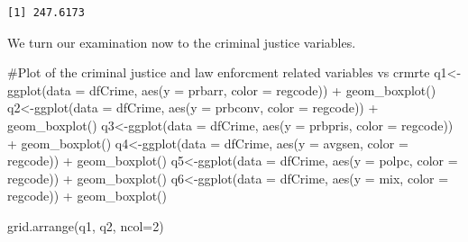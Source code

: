 \documentclass[]{article}
\newenvironment{Shaded}{}{}
\newcommand{\CommentTok}[1]{\textcolor[rgb]{0.00,0.50,0.00}{#1}}
\newcommand{\DataTypeTok}[1]{#1}
\newcommand{\DecValTok}[1]{#1}
\newcommand{\KeywordTok}[1]{\textcolor[rgb]{0.00,0.00,1.00}{#1}}
\newcommand{\NormalTok}[1]{#1}
\newcommand{\OperatorTok}[1]{#1}
\newcommand{\StringTok}[1]{\textcolor[rgb]{0.00,0.50,0.50}{#1}}
\begin{document}
\begin{verbatim}
[1] 247.6173
\end{verbatim}

We turn our examination now to the criminal justice variables.

\begin{Shaded}
\begin{Highlighting}[]
\CommentTok{#Plot of the criminal justice and law enforcment related variables vs crmrte}
\NormalTok{q1<-}\KeywordTok{ggplot}\NormalTok{(}\DataTypeTok{data =}\NormalTok{ dfCrime, }\KeywordTok{aes}\NormalTok{(}\DataTypeTok{y =}\NormalTok{ prbarr, }\DataTypeTok{color =}\NormalTok{ regcode)) }\OperatorTok{+}
\StringTok{      }\KeywordTok{geom_boxplot}\NormalTok{()}
\NormalTok{q2<-}\KeywordTok{ggplot}\NormalTok{(}\DataTypeTok{data =}\NormalTok{ dfCrime, }\KeywordTok{aes}\NormalTok{(}\DataTypeTok{y =}\NormalTok{ prbconv, }\DataTypeTok{color =}\NormalTok{ regcode)) }\OperatorTok{+}
\StringTok{      }\KeywordTok{geom_boxplot}\NormalTok{()}
\NormalTok{q3<-}\KeywordTok{ggplot}\NormalTok{(}\DataTypeTok{data =}\NormalTok{ dfCrime, }\KeywordTok{aes}\NormalTok{(}\DataTypeTok{y =}\NormalTok{ prbpris, }\DataTypeTok{color =}\NormalTok{ regcode)) }\OperatorTok{+}
\StringTok{      }\KeywordTok{geom_boxplot}\NormalTok{()}
\NormalTok{q4<-}\KeywordTok{ggplot}\NormalTok{(}\DataTypeTok{data =}\NormalTok{ dfCrime, }\KeywordTok{aes}\NormalTok{(}\DataTypeTok{y =}\NormalTok{ avgsen, }\DataTypeTok{color =}\NormalTok{ regcode)) }\OperatorTok{+}
\StringTok{      }\KeywordTok{geom_boxplot}\NormalTok{()}
\NormalTok{q5<-}\KeywordTok{ggplot}\NormalTok{(}\DataTypeTok{data =}\NormalTok{ dfCrime, }\KeywordTok{aes}\NormalTok{(}\DataTypeTok{y =}\NormalTok{ polpc, }\DataTypeTok{color =}\NormalTok{ regcode)) }\OperatorTok{+}
\StringTok{      }\KeywordTok{geom_boxplot}\NormalTok{()}
\NormalTok{q6<-}\KeywordTok{ggplot}\NormalTok{(}\DataTypeTok{data =}\NormalTok{ dfCrime, }\KeywordTok{aes}\NormalTok{(}\DataTypeTok{y =}\NormalTok{ mix, }\DataTypeTok{color =}\NormalTok{ regcode)) }\OperatorTok{+}
\StringTok{      }\KeywordTok{geom_boxplot}\NormalTok{()}

\KeywordTok{grid.arrange}\NormalTok{(q1, q2, }\DataTypeTok{ncol=}\DecValTok{2}\NormalTok{)}
\end{Highlighting}
\end{Shaded}
\end{document}
